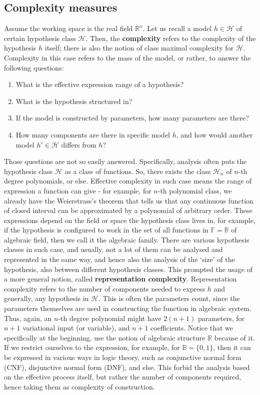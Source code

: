 \documentclass[10pt]{article}
\begin{document}
\subsection{Complexity measures}

Assume the working space is the real field $\mathbb{R}^{n}$. Let us recall a model $h\in\mathcal{H}$ of certain hypothesis class $\mathcal{H}$. Then, the \textbf{complexity} refers to the complexity of the hypothesis $h$ itself; there is also the notion of class maximal complexity for $\mathcal{H}$. Complexity in this case refers to the mass of the model, or rather, to answer the following questions:
\begin{enumerate}[itemsep=0.5pt,topsep=0.5pt]
    \item What is the effective expression range of a hypothesis?
    \item What is the hypothesis structured in?
    \item If the model is constructed by parameters, how many parameters are there?
    \item How many components are there in specific model $h$, and how would another model $h'\in \mathcal{H}$ differs from $h$?
\end{enumerate}
Those questions are not so easily answered. Specifically, analysis often puts the hypothesis class $\mathcal{H}$ as a class of functions. So, there exists the class $\mathcal{H}_{n}$ of $n$-th degree polynomials, or else. Effective complexity in such case means the range of expression a function can give - for example, for $n$-th polynomial class, we already have the Weierstrass's theorem that tells us that any continuous function of closed interval can be approximated by a polynomial of arbitrary order. These expressions depend on the field or space the hypothesis class lives in, for example, if the hypothesis is configured to work in the set of all functions in $\mathbb{F}=\mathbb{R}$ of algebraic field, then we call it the algebraic family. There are various hypothesis classes in such case, and usually, not a lot of them can be analysed and represented in the same way, and hence also the analysis of the `size' of the hypothesis, also between different hypothesis classes. This prompted the usage of a more general notion, called \textbf{representation complexity}. Representation complexity refers to the number of components needed to express $h$ and generally, any hypothesis in $\mathcal{H}$. This is often the parameters count, since the parameters themselves are used in constructing the function in algebraic system. Thus, again, an $n$-th degree polynomial might have $2(n+1)$ parameters, for $n+1$ variational input (or variable), and $n+1$ coefficients. Notice that we specifically at the beginning, use the notion of algebraic structure $\mathbb{R}$ because of it. If we restrict ourselves to the expression, for example, for $\mathbb{B}=\{0,1\}$, then it can be expressed in various ways in logic theory, such as conjunctive normal form (CNF), disjunctive normal form (DNF), and else. This forbid the analysis based on the effective process itself, but rather the number of components required, hence taking them as complexity of construction. 
\end{document}
